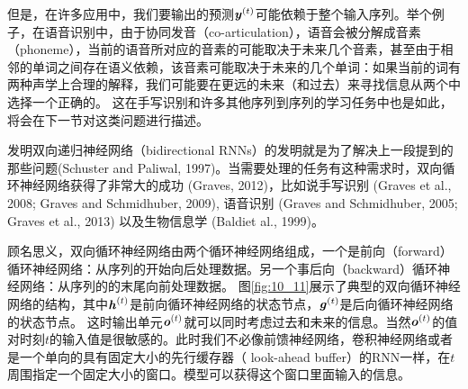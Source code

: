 但是，在许多应用中，我们要输出的预测$\boldsymbol{\mathit{y}}^{(t)}$可能依赖于整个输入序列。举个例子，在语音识别中，由于协同发音（co-articulation），语音会被分解成音素（phoneme），当前的语音所对应的音素的可能取决于未来几个音素，甚至由于相邻的单词之间存在语义依赖，该音素可能取决于未来的几个单词：如果当前的词有两种声学上合理的解释，我们可能要在更远的未来（和过去）来寻找信息从两个中选择一个正确的。
这在手写识别和许多其他序列到序列的学习任务中也是如此，将会在下一节对这类问题进行描述。

发明双向递归神经网络（bidirectional RNNs）的发明就是为了解决上一段提到的那些问题(Schuster and Paliwal, 1997)。当需要处理的任务有这种需求时，双向循环神经网络获得了非常大的成功 (Graves, 2012)，比如说手写识别 (Graves et al., 2008; Graves and Schmidhuber, 2009), 语音识别 (Graves and Schmidhuber, 2005; Graves et al., 2013) 以及生物信息学 (Baldiet al., 1999)。

顾名思义，双向循环神经网络由两个循环神经网络组成，一个是前向（forward）循环神经网络：从序列的开始向后处理数据。另一个事后向（backward）循环神经网络：从序列的的末尾向前处理数据。
图\ref{fig:10_11}展示了典型的双向循环神经网络的结构，其中$\boldsymbol{\mathit{h}}^{(t)}$是前向循环神经网络的状态节点，$\boldsymbol{\mathit{g}}^{(t)}$是后向循环神经网络的状态节点。
这时输出单元$\boldsymbol{\mathit{o}}^{(t)}$就可以同时考虑过去和未来的信息。当然$\boldsymbol{\mathit{o}}^{(t)}$的值对时刻$t$的输入值是很敏感的。此时我们不必像前馈神经网络，卷积神经网络或者是一个单向的具有固定大小的先行缓存器（ look-ahead buﬀer）的RNN一样，在$t$周围指定一个固定大小的窗口。模型可以获得这个窗口里面输入的信息。


